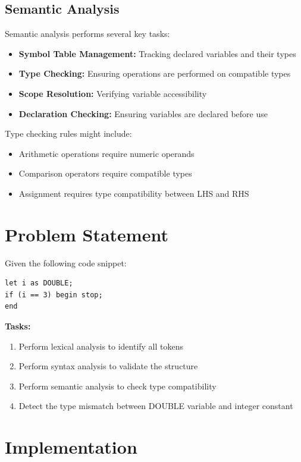 \documentclass[12pt,a4paper]{article}
\begin{document}
\subsection{Semantic Analysis}

Semantic analysis performs several key tasks:
\begin{itemize}
    \item \textbf{Symbol Table Management:} Tracking declared variables and their types
    \item \textbf{Type Checking:} Ensuring operations are performed on compatible types
    \item \textbf{Scope Resolution:} Verifying variable accessibility
    \item \textbf{Declaration Checking:} Ensuring variables are declared before use
\end{itemize}

Type checking rules might include:
\begin{itemize}
    \item Arithmetic operations require numeric operands
    \item Comparison operators require compatible types
    \item Assignment requires type compatibility between LHS and RHS
\end{itemize}

\section{Problem Statement}

Given the following code snippet:
\begin{lstlisting}[caption={Input code for analysis}]
let i as DOUBLE;
if (i == 3) begin stop;
end
\end{lstlisting}

\textbf{Tasks:}
\begin{enumerate}
    \item Perform lexical analysis to identify all tokens
    \item Perform syntax analysis to validate the structure
    \item Perform semantic analysis to check type compatibility
    \item Detect the type mismatch between DOUBLE variable and integer constant
\end{enumerate}

\section{Implementation}
\end{document}
